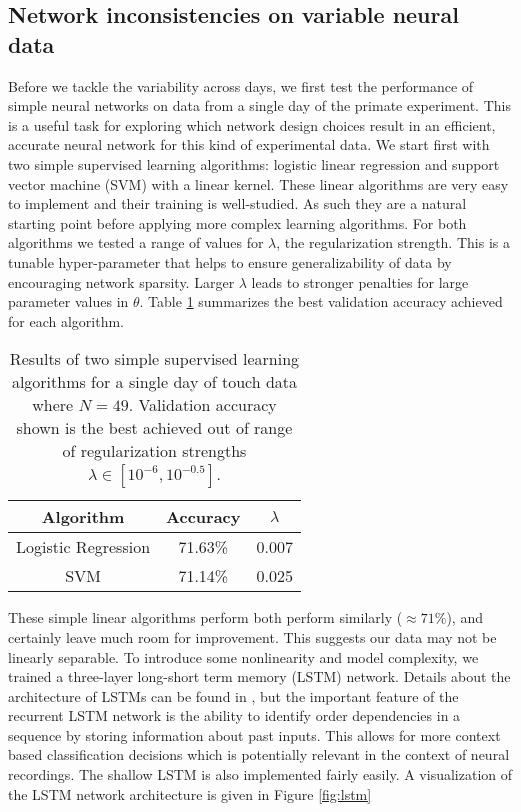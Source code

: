 \documentclass[12pt]{article}
\begin{document}
\subsection{Network inconsistencies on variable neural data}
\indent Before we tackle the variability across days, we first test the performance of simple neural networks on data from a single day of the primate experiment. This is a useful task for exploring which network design choices result in an efficient, accurate neural network for this kind of experimental data. We start first with two simple supervised learning algorithms:  logistic linear regression and support vector machine (SVM) with a linear kernel. These linear algorithms are very easy to implement and their training is well-studied. As such they are a natural starting point before applying more complex learning algorithms. For both algorithms we tested a range of values for $\lambda$, the regularization strength. This is a tunable hyper-parameter that helps to ensure generalizability of data by encouraging network sparsity. Larger $\lambda$ leads to stronger penalties for large parameter values in $\theta$. Table \ref{tab:simp} summarizes the best validation accuracy achieved for each algorithm. \\
\begin{table}[]
  \centering
\begin{tabular}{|c|c|c|}
  \hline
                Algorithm    & Accuracy & $\lambda$  \\
                      \hline
Logistic Regression & 71.63\%  & 0.007   \\
  \hline
SVM                 & 71.14\%  & 0.025    \\
  \hline

\end{tabular}
\caption{Results of two simple supervised learning algorithms for a single day of touch data where $N = 49$. Validation accuracy shown is the best achieved out of range of regularization strengths  $\lambda \in [10^{-6},10^{-0.5}]$.}
\label{tab:simp}
\end{table}
These simple linear algorithms perform both perform similarly ($\approx 71\%$), and certainly leave much room for improvement. This suggests our data may not be linearly separable. To introduce some nonlinearity and model complexity, we trained a three-layer long-short term memory (LSTM) network. Details about the architecture of LSTMs can be found in \cite{bengio}, but the important feature of the recurrent LSTM network is the ability to identify order dependencies in a sequence by storing information about past inputs. This allows for more context based classification decisions which is potentially relevant in the context of neural recordings. The shallow LSTM is also implemented fairly easily. A visualization of the LSTM network architecture is given in Figure \ref{fig:lstm} \\
\end{document}
